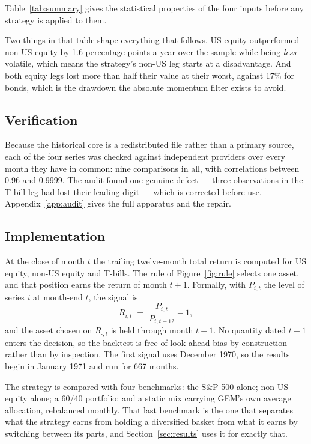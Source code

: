 \documentclass[11pt,a4paper]{article}
\let\oldsubsection\subsection
\renewcommand{\subsection}{\FloatBarrier\oldsubsection}
\begin{document}
Table~\ref{tab:summary} gives the statistical properties of the four inputs
before any strategy is applied to them.

\begin{table}[htbp]
  \centering
  \caption{Summary statistics of the four input series.}
  \label{tab:summary}
  
\end{table}

Two things in that table shape everything that follows. US equity outperformed
non-US equity by 1.6 percentage points a year over the sample while being
\emph{less} volatile, which means the strategy's non-US leg starts at a
disadvantage. And both equity legs lost more than half their value at their
worst, against 17\% for bonds, which is the drawdown the absolute momentum
filter exists to avoid.

\subsection{Verification}

Because the historical core is a redistributed file rather than a primary
source, each of the four series was checked against independent providers over
every month they have in common: nine comparisons in all, with correlations
between 0.96 and 0.9999. The audit found one genuine defect --- three
observations in the T-bill leg had lost their leading digit --- which is
corrected before use. Appendix~\ref{app:audit} gives the full apparatus and the
repair.

\subsection{Implementation}

At the close of month $t$ the trailing twelve-month total return is computed for
US equity, non-US equity and T-bills. The rule of Figure~\ref{fig:rule} selects
one asset, and that position earns the return of month $t+1$. Formally, with
$P_{i,t}$ the level of series $i$ at month-end $t$, the signal is
\[
  R_{i,t} \;=\; \frac{P_{i,t}}{P_{i,t-12}} - 1 ,
\]
and the asset chosen on $R_{\cdot,t}$ is held through month $t+1$. No quantity
dated $t+1$ enters the decision, so the backtest is free of look-ahead bias by
construction rather than by inspection. The first signal uses December 1970, so
the results begin in January 1971 and run for 667 months.

The strategy is compared with four benchmarks: the S\&P 500 alone; non-US
equity alone; a 60/40 portfolio; and a static mix carrying GEM's own average
allocation, rebalanced monthly. That last benchmark is the one that separates
what the strategy earns from holding a diversified basket from what it earns by
switching between its parts, and Section~\ref{sec:results} uses it for exactly
that.
\end{document}
